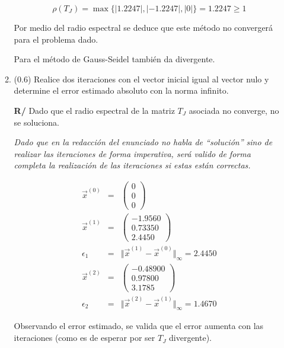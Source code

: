 \documentclass[12pt]{article}
\begin{document}
\begin{enumerate}[leftmargin=*,widest=9]
\begin{enumerate}[label=\alph*]
    \[
    \rho(T_J) = \max\lbrace |1.2247|, |-1.2247|, |0| \rbrace = 1.2247 \geq 1
    \]
    
    Por medio del radio espectral se deduce que este método no convergerá para el problema dado.
    
    Para el método de Gauss-Seidel también da divergente.
    
    \item (\(0.6\)) Realice dos iteraciones con el vector inicial igual al vector nulo y determine el error estimado absoluto con la norma infinito.
  
  \textbf{R/} Dado que el radio espectral de la matriz \(T_J\) asociada no converge, no se soluciona.
  
  \textit{Dado que en la redacción del enunciado no habla de ``solución'' sino de realizar las iteraciones de forma imperativa, será valido de forma completa la realización de las iteraciones si estas están correctas.}
  
  \begin{eqnarray*}
   \vec{x}^{(0)} & = & \begin{pmatrix}
    0 \\ 0 \\ 0 
    \end{pmatrix} \\
    \vec{x}^{(1)} & = & \begin{pmatrix}
    -1.9560 \\ 0.73350 \\ 2.4450 
    \end{pmatrix} \\
    \epsilon_1 & = & \Vert \vec{x}^{(1)} - \vec{x}^{(0)} \Vert_\infty = 2.4450\\
    \vec{x}^{(2)} & = & \begin{pmatrix}
    -0.48900 \\ 0.97800 \\ 3.1785 
    \end{pmatrix} \\
    \epsilon_2 & = & \Vert \vec{x}^{(2)} - \vec{x}^{(1)} \Vert_\infty = 1.4670
  \end{eqnarray*}
  
  Observando el error estimado, se valida que el error aumenta con las iteraciones (como es de esperar por ser \(T_J\) divergente).
  
  
  
\end{enumerate}
  \end{enumerate}
\end{document}
